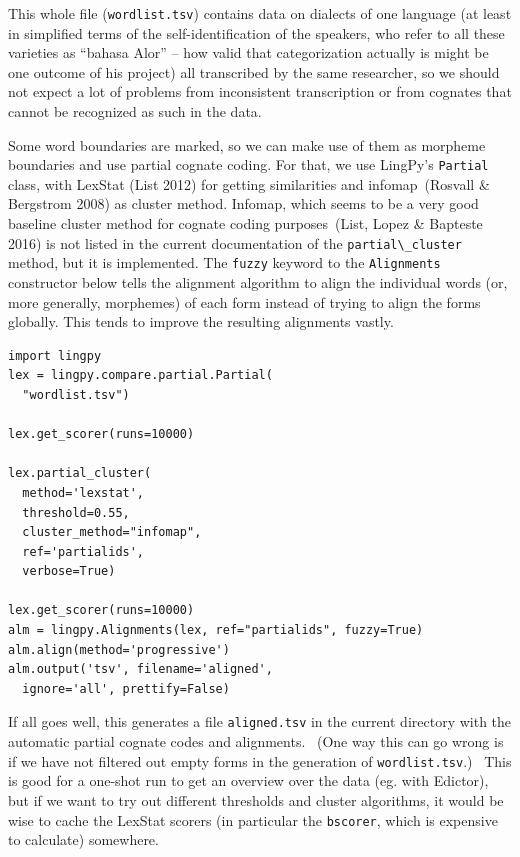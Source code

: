\documentclass[
  english,
  a4paper,
  oneside,tablecaptionabove
]{scrbook}
\newcommand{\passthrough}[1]{#1}
\begin{document}
This whole file (\passthrough{\lstinline!wordlist.tsv!}) contains data
on dialects of one language (at least in simplified terms of the
self-identification of the speakers, who refer to all these varieties as
\enquote{bahasa Alor} -- how valid that categorization actually is might
be one outcome of his project) all transcribed by the same researcher,
so we should not expect a lot of problems from inconsistent
transcription or from cognates that cannot be recognized as such in the
data.

Some word boundaries are marked, so we can make use of them as morpheme
boundaries and use partial cognate coding. For that, we use LingPy's
\passthrough{\lstinline!Partial!} class, with LexStat (List 2012) for
getting similarities and infomap~(Rosvall \& Bergstrom 2008) as cluster
method. Infomap, which seems to be a very good baseline cluster method
for cognate coding purposes~(List, Lopez \& Bapteste 2016) is not listed
in the current documentation of the
\passthrough{\lstinline!partial\_cluster!} method, but it is
implemented. The \passthrough{\lstinline!fuzzy!} keyword to the
\passthrough{\lstinline!Alignments!} constructor below tells the
alignment algorithm to align the individual words (or, more generally,
morphemes) of each form instead of trying to align the forms globally.
This tends to improve the resulting alignments vastly.

\begin{lstlisting}
import lingpy
lex = lingpy.compare.partial.Partial(
  "wordlist.tsv")

lex.get_scorer(runs=10000)

lex.partial_cluster(
  method='lexstat',
  threshold=0.55,
  cluster_method="infomap",
  ref='partialids',
  verbose=True)

lex.get_scorer(runs=10000)
alm = lingpy.Alignments(lex, ref="partialids", fuzzy=True)
alm.align(method='progressive')
alm.output('tsv', filename='aligned',
  ignore='all', prettify=False)
\end{lstlisting}

If all goes well, this generates a file
\passthrough{\lstinline!aligned.tsv!} in the current directory with the
automatic partial cognate codes and alignments.~ (One way this can go
wrong is if we have not filtered out empty forms in the generation of
\passthrough{\lstinline!wordlist.tsv!}.) ~This is good for a one-shot
run to get an overview over the data (eg. with Edictor), but if we want
to try out different thresholds and cluster algorithms, it would be wise
to cache the LexStat scorers (in particular the
\passthrough{\lstinline!bscorer!}, which is expensive to calculate)
somewhere.
\end{document}

